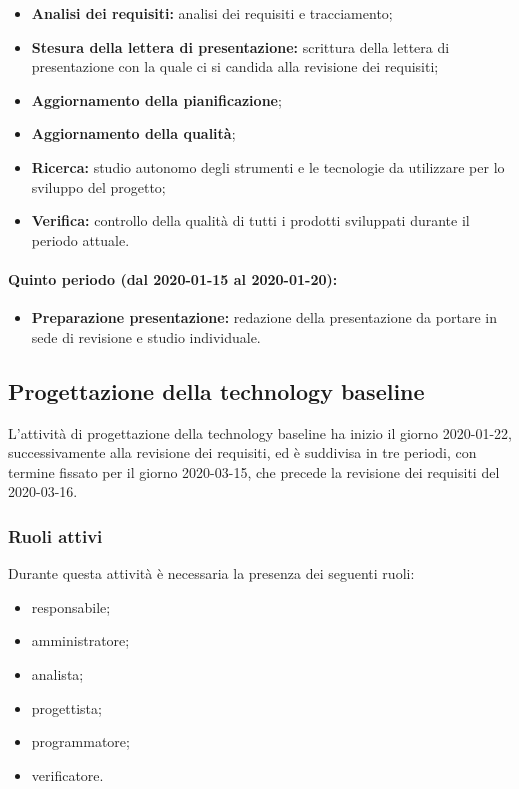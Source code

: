 				\begin{itemize}
					\item \textbf{Analisi dei requisiti:} analisi dei requisiti e tracciamento;
					\item \textbf{Stesura della lettera di presentazione:} scrittura della lettera di presentazione con la quale ci si candida alla revisione dei requisiti;
					\item \textbf{Aggiornamento della pianificazione};
					\item \textbf{Aggiornamento della qualità};
					\item \textbf{Ricerca:} studio autonomo degli strumenti e le tecnologie da utilizzare per lo sviluppo del progetto;
					\item \textbf{Verifica:} controllo della qualità di tutti i prodotti sviluppati durante il periodo attuale.
				\end{itemize}
			
			\paragraph{Quinto periodo (dal 2020-01-15 al 2020-01-20):}
			
				\begin{itemize}
					\item \textbf{Preparazione presentazione:} redazione della presentazione da portare in sede di revisione e studio individuale.
				\end{itemize}

		\subsection{Progettazione della technology baseline}
	
			L'attività di progettazione della technology baseline ha inizio il giorno 2020-01-22, successivamente alla revisione dei requisiti, ed è suddivisa in tre periodi, con termine fissato per il giorno 2020-03-15, che precede la revisione dei requisiti del 2020-03-16.
			
			\subsubsection{Ruoli attivi}
			
				Durante questa attività è necessaria la presenza dei seguenti ruoli:
				\begin{itemize}
					\item responsabile;
					\item amministratore;
					\item analista;
					\item progettista;
					\item programmatore;
					\item verificatore.
				\end{itemize}
			
